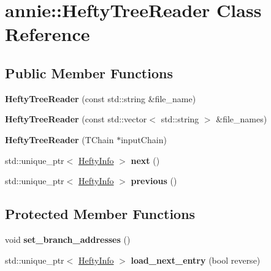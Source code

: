 \hypertarget{classannie_1_1HeftyTreeReader}{
\section{annie::HeftyTreeReader Class Reference}
\label{classannie_1_1HeftyTreeReader}
}
\subsection*{Public Member Functions}
\begin{DoxyCompactItemize}
\item 
\hypertarget{classannie_1_1HeftyTreeReader_ac15660ea2670e502c68bc9f80793ae23}{
{\bfseries HeftyTreeReader} (const std::string \&file\_\-name)}
\label{classannie_1_1HeftyTreeReader_ac15660ea2670e502c68bc9f80793ae23}

\item 
\hypertarget{classannie_1_1HeftyTreeReader_a70c65b445f31d18c7ce8c60bd67f2a62}{
{\bfseries HeftyTreeReader} (const std::vector$<$ std::string $>$ \&file\_\-names)}
\label{classannie_1_1HeftyTreeReader_a70c65b445f31d18c7ce8c60bd67f2a62}

\item 
\hypertarget{classannie_1_1HeftyTreeReader_ab82488607c07679869f478b9ec7d88c7}{
{\bfseries HeftyTreeReader} (TChain $\ast$inputChain)}
\label{classannie_1_1HeftyTreeReader_ab82488607c07679869f478b9ec7d88c7}

\item 
\hypertarget{classannie_1_1HeftyTreeReader_a370da5616b748d31cedf3063769de5db}{
std::unique\_\-ptr$<$ \hyperlink{classHeftyInfo}{HeftyInfo} $>$ {\bfseries next} ()}
\label{classannie_1_1HeftyTreeReader_a370da5616b748d31cedf3063769de5db}

\item 
\hypertarget{classannie_1_1HeftyTreeReader_a385017d9b438fc2118be8e67f5a8b7ac}{
std::unique\_\-ptr$<$ \hyperlink{classHeftyInfo}{HeftyInfo} $>$ {\bfseries previous} ()}
\label{classannie_1_1HeftyTreeReader_a385017d9b438fc2118be8e67f5a8b7ac}

\end{DoxyCompactItemize}
\subsection*{Protected Member Functions}
\begin{DoxyCompactItemize}
\item 
\hypertarget{classannie_1_1HeftyTreeReader_a96aa45bd0418dd809a9b5b30f1b0d1c2}{
void {\bfseries set\_\-branch\_\-addresses} ()}
\label{classannie_1_1HeftyTreeReader_a96aa45bd0418dd809a9b5b30f1b0d1c2}

\item 
\hypertarget{classannie_1_1HeftyTreeReader_aeaabddbcd009a65cf22f45dc3b7d4650}{
std::unique\_\-ptr$<$ \hyperlink{classHeftyInfo}{HeftyInfo} $>$ {\bfseries load\_\-next\_\-entry} (bool reverse)}
\label{classannie_1_1HeftyTreeReader_aeaabddbcd009a65cf22f45dc3b7d4650}

\end{DoxyCompactItemize}
